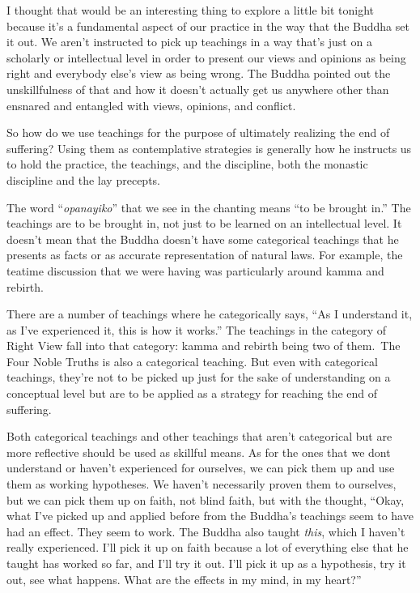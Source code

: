 I thought that would be an interesting thing to explore a little bit tonight because it's a fundamental aspect of our practice in the way that the Buddha set it out. We aren't instructed to pick up teachings in a way that's just on a scholarly or intellectual level in order to present our views and opinions as being right and everybody else's view as being wrong. The Buddha pointed out the unskillfulness of that and how it doesn't actually get us anywhere other than ensnared and entangled with views, opinions, and conflict.~

So how do we use teachings for the purpose of ultimately realizing the end of suffering? Using them as contemplative strategies is generally how he instructs us to hold the practice, the teachings, and the discipline, both the monastic discipline and the lay precepts.

The word ``\emph{opanayiko}'' that we see in the chanting means ``to be brought in.'' The teachings are to be brought in, not just to be learned on an intellectual level. It doesn't mean that the Buddha doesn't have some categorical teachings that he presents as facts or as accurate representation of natural laws. For example, the teatime discussion that we were having was particularly around kamma and rebirth.

There are a number of teachings where he categorically says, ``As I understand it, as I've experienced it, this is how it works.'' The teachings in the category of Right View fall into that category: kamma and rebirth being two of them.~The Four Noble Truths is also a categorical teaching. But even with categorical teachings, they're not to be picked up just for the sake of understanding on a conceptual level but are to be applied as a strategy for reaching the end of suffering.

Both categorical teachings and other teachings that aren't categorical but are more reflective should be used as skillful means. As for the ones that we don\textquotesingle t understand or haven't experienced for ourselves, we can pick them up and use them as working hypotheses. We haven't necessarily proven them to ourselves, but we can pick them up on faith, not blind faith, but with the thought, ``Okay, what I've picked up and applied before from the Buddha's teachings seem to have had an effect. They seem to work. The Buddha also taught \emph{this}, which I haven't really experienced. I'll pick it up on faith because a lot of everything else that he taught has worked so far, and I'll try it out. I'll pick it up as a hypothesis, try it out, see what happens. What are the effects in my mind, in my heart?''

